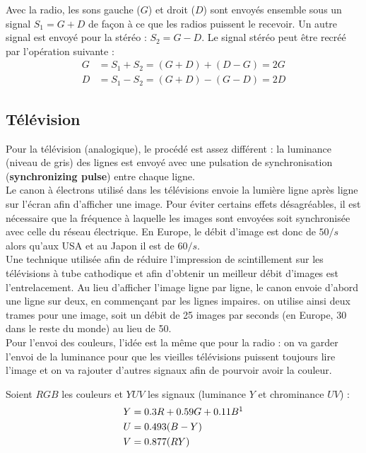 Avec la radio, les sons gauche ($G$) et droit ($D$) sont envoyés ensemble sous un signal $S_1 = G + D$ de façon à ce que les radios puissent le recevoir. Un autre signal est envoyé pour la stéréo : $S_2 = G -D$. Le signal stéréo peut être recréé par l'opération suivante :
\begin{align*}
G &= S_1 + S_2 = (G+D) + (D-G) = 2G\\
D &= S_1 - S_2 = (G+D) - (G-D) = 2D
\end{align*}

\subsection{Télévision}
Pour la télévision (analogique), le procédé est assez différent : la luminance (niveau de gris) des lignes est envoyé avec une pulsation de synchronisation (\textbf{synchronizing pulse}) entre chaque ligne.\\
Le canon à électrons utilisé dans les télévisions envoie la lumière ligne après ligne sur l'écran afin d'afficher une image. Pour éviter certains effets désagréables, il est nécessaire que la fréquence à laquelle les images sont envoyées soit synchronisée avec celle du réseau électrique. En Europe, le débit d'image est donc de $50/s$ alors qu'aux USA et au Japon il est de $60/s$.\\
Une technique utilisée afin de réduire l'impression de scintillement sur les télévisions à tube cathodique et afin d'obtenir un meilleur débit d'images est l'entrelacement. Au lieu d'afficher l'image ligne par ligne, le canon envoie d'abord une ligne sur deux, en commençant par les lignes impaires. on utilise ainsi deux trames pour une image, soit un débit de 25 images par seconds (en Europe, 30 dans le reste du monde) au lieu de 50.\\
Pour l'envoi des couleurs, l'idée est la même que pour la radio : on va garder l'envoi de la luminance pour que les vieilles télévisions puissent toujours lire l'image et on va rajouter d'autres signaux afin de pourvoir avoir la couleur.

Soient $RGB$ les couleurs et $YUV$ les signaux (luminance $Y$ et chrominance $UV$) :
\begin{align*}
Y &= 0.3R + 0.59G + 0.11B\footnotemark\\
U &= 0.493(B- Y)\\
V &= 0.877(RY)
\end{align*}

